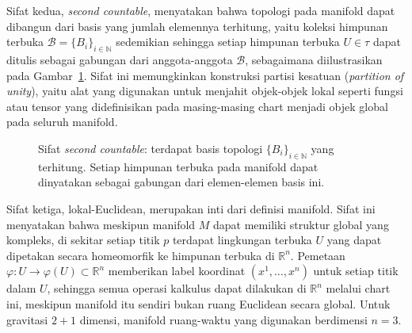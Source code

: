 Sifat kedua, \textit{second countable}, menyatakan bahwa topologi pada manifold dapat dibangun dari basis yang jumlah elemennya terhitung, yaitu koleksi himpunan terbuka $\mathcal{B} = \{B_i\}_{i \in \mathbb{N}}$ sedemikian sehingga setiap himpunan terbuka $U \in \tau$ dapat ditulis sebagai gabungan dari anggota-anggota $\mathcal{B}$, sebagaimana diilustrasikan pada Gambar~\ref{fig:second-countable}. Sifat ini memungkinkan konstruksi partisi kesatuan (\textit{partition of unity}), yaitu alat yang digunakan untuk menjahit objek-objek lokal seperti fungsi atau tensor yang didefinisikan pada masing-masing chart menjadi objek global pada seluruh manifold.

\begin{figure}[H]
\centering
{}
\caption{Sifat \textit{second countable}: terdapat basis topologi $\{B_i\}_{i \in \mathbb{N}}$ yang terhitung. Setiap himpunan terbuka pada manifold dapat dinyatakan sebagai gabungan dari elemen-elemen basis ini.}
\label{fig:second-countable}
\end{figure}

Sifat ketiga, lokal-Euclidean, merupakan inti dari definisi manifold. Sifat ini menyatakan bahwa meskipun manifold $M$ dapat memiliki struktur global yang kompleks, di sekitar setiap titik $p$ terdapat lingkungan terbuka $U$ yang dapat dipetakan secara homeomorfik ke himpunan terbuka di $\mathbb{R}^n$. Pemetaan $\varphi : U \to \varphi(U) \subset \mathbb{R}^n$ memberikan label koordinat $(x^1, \ldots, x^n)$ untuk setiap titik dalam $U$, sehingga semua operasi kalkulus dapat dilakukan di $\mathbb{R}^n$ melalui chart ini, meskipun manifold itu sendiri bukan ruang Euclidean secara global. Untuk gravitasi $2+1$ dimensi, manifold ruang-waktu yang digunakan berdimensi $n = 3$.

